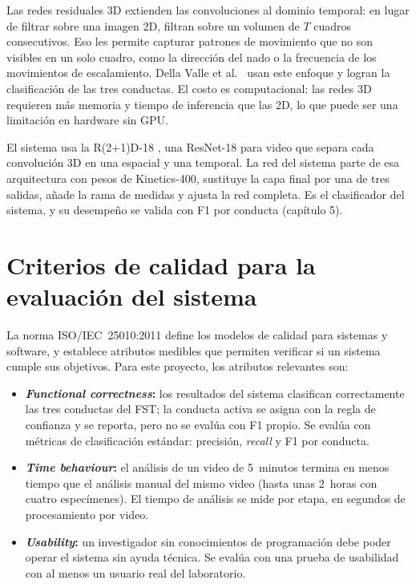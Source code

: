 Las redes residuales 3D extienden las convoluciones al dominio temporal: en lugar de
filtrar sobre una imagen 2D, filtran sobre un volumen de $T$ cuadros consecutivos.
Eso les permite capturar patrones de movimiento que no son visibles en un solo cuadro,
como la dirección del nado o la frecuencia de los movimientos de escalamiento. Della
Valle et al.\ \cite{della_valle2025} usan este enfoque y logran la clasificación de las
tres conductas. El costo es computacional: las redes 3D requieren más memoria y tiempo
de inferencia que las 2D, lo que puede ser una limitación en hardware sin GPU.

El sistema usa la R(2+1)D-18 \cite{tran2018}, una ResNet-18 para video que
separa cada convolución 3D en una espacial y una temporal. La red del sistema parte de esa arquitectura con pesos de
Kinetics-400, sustituye la capa final por una de tres salidas, añade la rama de medidas y ajusta la red completa. Es el
clasificador del sistema, y su desempeño se valida con F1 por conducta (capítulo 5).

\section{Criterios de calidad para la evaluación del sistema}

La norma ISO/IEC~25010:2011 \cite{iso25010} define los modelos de calidad para sistemas
y software, y establece atributos medibles que permiten verificar si un sistema cumple
sus objetivos. Para este proyecto, los atributos relevantes son:

\begin{itemize}
  \item \textbf{\textit{Functional correctness}:} los resultados del sistema clasifican
        correctamente las tres conductas del FST; la conducta activa se asigna con la regla de confianza y se reporta, pero no se evalúa con F1 propio. Se evalúa con métricas de
        clasificación estándar: precisión, \textit{recall} y F1 por conducta.
  \item \textbf{\textit{Time behaviour}:} el análisis de un video de 5~minutos termina
        en menos tiempo que el análisis manual del mismo video (hasta unas 2~horas con cuatro especímenes). El tiempo de análisis se mide por etapa, en segundos de
        procesamiento por video.
  \item \textbf{\textit{Usability}:} un investigador sin conocimientos de programación debe
        poder operar el sistema sin ayuda técnica. Se evalúa con una prueba de
        usabilidad con al menos un usuario real del laboratorio.
\end{itemize}

